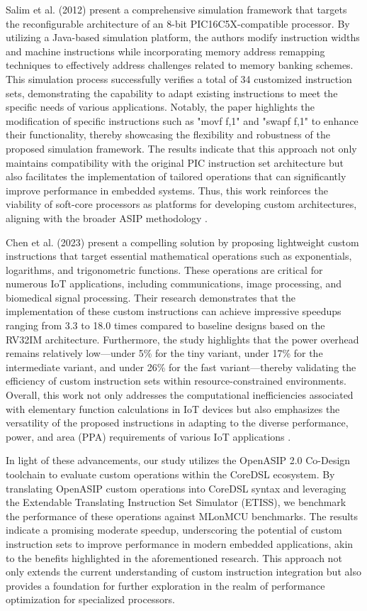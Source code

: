 Salim et al. (2012) present a comprehensive simulation framework that targets the reconfigurable architecture of an 8-bit PIC16C5X-compatible processor. By utilizing a Java-based simulation platform, the authors modify instruction widths and machine instructions while incorporating memory address remapping techniques to effectively address challenges related to memory banking schemes. This simulation process successfully verifies a total of 34 customized instruction sets, demonstrating the capability to adapt existing instructions to meet the specific needs of various applications. Notably, the paper highlights the modification of specific instructions such as "movf f,1" and "swapf f,1" to enhance their functionality, thereby showcasing the flexibility and robustness of the proposed simulation framework. The results indicate that this approach not only maintains compatibility with the original PIC instruction set architecture but also facilitates the implementation of tailored operations that can significantly improve performance in embedded systems. Thus, this work reinforces the viability of soft-core processors as platforms for developing custom architectures, aligning with the broader ASIP methodology \cite{salim2012customized}.

Chen et al. (2023) present a compelling solution by proposing lightweight custom instructions that target essential mathematical operations such as exponentials, logarithms, and trigonometric functions. These operations are critical for numerous IoT applications, including communications, image processing, and biomedical signal processing. Their research demonstrates that the implementation of these custom instructions can achieve impressive speedups ranging from 3.3 to 18.0 times compared to baseline designs based on the RV32IM architecture. Furthermore, the study highlights that the power overhead remains relatively low—under 5\% for the tiny variant, under 17\% for the intermediate variant, and under 26\% for the fast variant—thereby validating the efficiency of custom instruction sets within resource-constrained environments. Overall, this work not only addresses the computational inefficiencies associated with elementary function calculations in IoT devices but also emphasizes the versatility of the proposed instructions in adapting to the diverse performance, power, and area (PPA) requirements of various IoT applications \cite{chen2023risc}.

In light of these advancements, our study utilizes the OpenASIP 2.0 Co-Design toolchain to evaluate custom operations within the CoreDSL ecosystem. By translating OpenASIP custom operations into CoreDSL syntax and leveraging the Extendable Translating Instruction Set Simulator (ETISS), we benchmark the performance of these operations against MLonMCU benchmarks. The results indicate a promising moderate speedup, underscoring the potential of custom instruction sets to improve performance in modern embedded applications, akin to the benefits highlighted in the aforementioned research. This approach not only extends the current understanding of custom instruction integration but also provides a foundation for further exploration in the realm of performance optimization for specialized processors.